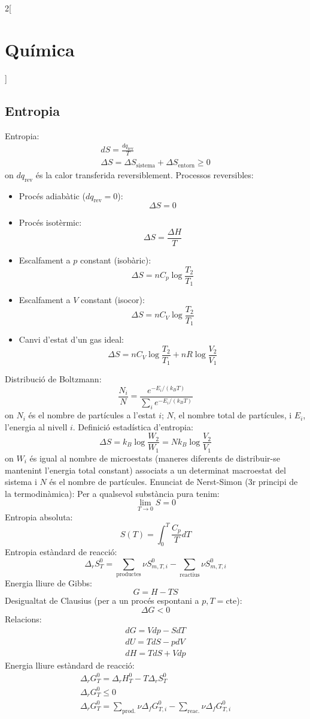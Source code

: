 \documentclass[../../../main.tex]{subfiles}
\begin{document}
\begin{multicols}{2}[\section{Química}]
\subsection{Entropia}
Entropia:
\begin{gather*}
    dS=\frac{dq_\text{rev}}{T}\\
    \Delta S=\Delta S_{\text{sistema}}+\Delta S_{\text{entorn}}\geq 0
\end{gather*} {\footnotesize on $dq_\text{rev}$ és la calor transferida reversiblement.}\newline
Processos reversibles:
\begin{itemize}
    \item Procés adiabàtic ($dq_\text{rev}=0$):$$\Delta S=0$$
    \item Procés isotèrmic: $$\Delta S=\frac{\Delta H}{T}$$
    \item Escalfament a $p$ constant (isobàric): $$\Delta S=nC_p\log\frac{T_2}{T_1}$$
    \item Escalfament a $V$ constant (isocor): $$\Delta S=nC_V\log\frac{T_2}{T_1}$$
    \item Canvi d'estat d'un gas ideal: $$\Delta S=nC_V\log\frac{T_2}{T_1}+nR\log\frac{V_2}{V_1}$$
\end{itemize}
Distribució de Boltzmann: $$\frac{N_i}{N}=\frac{e^{-E_i/(k_BT)}}{\sum_ie^{-E_i/(k_BT)}}$$ {\footnotesize on $N_i$ és el nombre de partícules a l'estat $i$; $N$, el nombre total de partícules, i $E_i$, l'energia al nivell $i$.}\newline
Definició estadística d'entropia: $$\Delta S=k_B\log\frac{W_2}{W_1}=Nk_B\log\frac{V_2}{V_1}$$ {\footnotesize on $W_i$ és igual al nombre de microestats (maneres diferents de distribuir-se mantenint l’energia total constant) associats a un determinat macroestat del sistema i $N$ és el nombre de partícules.}\newline
Enunciat de Nerst-Simon (3r principi de la termodinàmica): Per a qualsevol substància pura tenim: $$\lim_{T\to0}S=0$$
Entropia absoluta: $$S(T)=\int_0^T\frac{C_p}{T}dT$$
Entropia estàndard de reacció: $$\Delta_rS_T^0=\sum_{\text{productes}}\nu S_{m,T,i}^0-\sum_{\text{reactius}}\nu S_{m,T,i}^0$$
Energia lliure de Gibbs: $$G=H-TS$$
Desigualtat de Clausius (per a un procés espontani a $p,T=$cte): $$\Delta G<0$$
Relacions:
\begin{gather*}
    dG=Vdp-SdT\\
    dU=TdS-pdV\\
    dH=TdS+Vdp
\end{gather*}
Energia lliure estàndard de reacció: \begin{gather*}
    \Delta_rG_T^0=\Delta_rH_T^0-T\Delta_rS_T^0\\
    \Delta_rG_T^0\leq 0\\
    \Delta_rG_T^0=\sum_{\text{prod.}}\nu\Delta_fG_{T,i}^0-\sum_{\text{reac.}}\nu\Delta_fG_{T,i}^0
\end{gather*}

\end{multicols}
\end{document}
